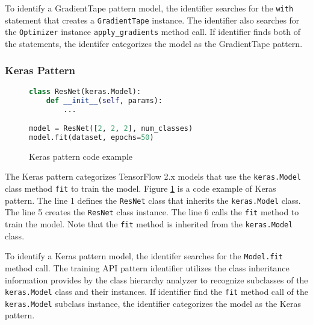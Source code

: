 To identify a GradientTape pattern model,
the identifier searches for the {\tt with} statement that creates a
{\tt GradientTape} instance.
The identifier also searches for the {\tt Optimizer} instance 
{\tt apply\_gradients} method call.
If identifier finds both of the statements, the identifer categorizes the
model as the GradientTape pattern.


\subsubsection{Keras Pattern}

\begin{figure}[ht!]
  \begin{lstlisting}[language=Python]
class ResNet(keras.Model):
    def __init__(self, params):
        ...

model = ResNet([2, 2, 2], num_classes)
model.fit(dataset, epochs=50)\end{lstlisting}
 
  \caption{Keras pattern code example}
  \label{fig:keraspattern}
\end{figure}

The Keras pattern categorizes TensorFlow 2.x models that use
the {\tt keras.Model} class method {\tt fit} to train the model. 
Figure \ref{fig:keraspattern} is a code example of Keras pattern.
The line 1 defines the {\tt ResNet} class that inherits the 
{\tt keras.Model} class. 
The line 5 creates the {\tt ResNet} class instance.
The line 6 calls the {\tt fit} method to train the model.
Note that the {\tt fit} method is inherited from the {\tt keras.Model} class.

To identify a Keras pattern model, the identifer searches for the
{\tt Model.fit} method call. The training API pattern identifier utilizes the
class inheritance information provides by the class hierarchy analyzer to
recognize subclasses of the {\tt keras.Model} class and their instances.
If identifier find the {\tt fit} method call of the {\tt keras.Model} subclass
instance, the identifier categorizes the model as the Keras pattern.

